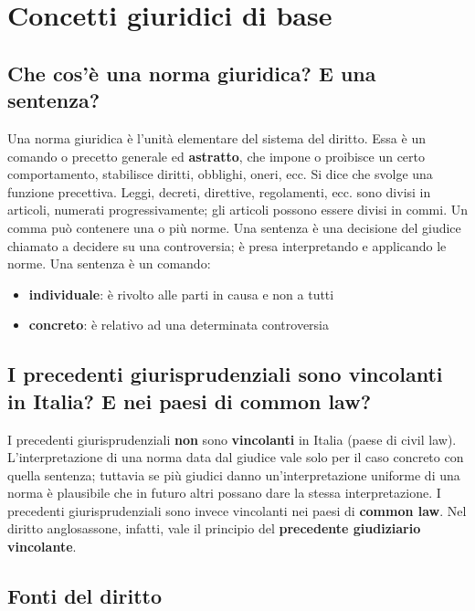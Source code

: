 \newpage
\section{Concetti giuridici di base}

\subsection{Che cos’è una norma giuridica? E una sentenza?}
Una norma giuridica è l'unità elementare del sistema del diritto.
Essa è un comando o precetto generale ed \textbf{astratto}, che impone o proibisce
un certo comportamento, stabilisce diritti, obblighi, oneri, ecc. Si dice che
svolge una funzione precettiva. \newline
Leggi, decreti, direttive, regolamenti, ecc. sono divisi in articoli, numerati
progressivamente; gli articoli possono essere divisi in commi. \newline
Un comma può contenere una o più norme. \newline
Una sentenza è una decisione del giudice chiamato a decidere su una controversia;
è presa interpretando e applicando le norme. \newline
Una sentenza è un comando:
\begin{itemize}
    \item \textbf{individuale}: è rivolto alle parti in causa e non a tutti
    \item \textbf{concreto}: è relativo ad una determinata controversia
\end{itemize}

\subsection{I precedenti giurisprudenziali sono vincolanti in Italia? E nei paesi di common law?}
I precedenti giurisprudenziali \textbf{non} sono \textbf{vincolanti} in Italia (paese di civil law).
L'interpretazione di una norma data dal giudice vale solo per il caso concreto
con quella sentenza; tuttavia se più giudici danno un'interpretazione uniforme
di una norma è plausibile che in futuro altri possano dare la stessa interpretazione.
\newline\newline
I precedenti giurisprudenziali sono invece vincolanti nei paesi di \textbf{common law}.
Nel diritto anglosassone, infatti, vale il principio del \textbf{precedente giudiziario vincolante}.

\subsection{Fonti del diritto}

